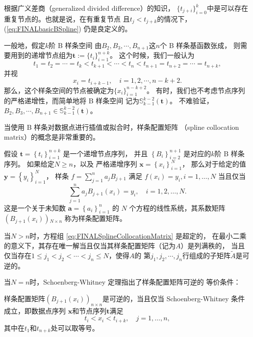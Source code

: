 根据广义差商（generalized divided difference）的知识，
$\{t_{j+i}\}_{i=0}^{k}$中是可以存在重复节点的。也就是说，在有重复节点
且$t_{j}<t_{j+k}$的情况下，(\ref{eq:FINALbasicBSpline}) 仍是良定义的。

一般地，假定$k$阶 B 样条空间
由$B_{2},B_{3},\cdots,B_{n+1}$这$n$个 B 样条基函数张成，
则需要用到的递增节点组为$\mathbf{t}:=\{t_{i}\}_{i=1}^{n+k}$。
这个时候，我们一般认为
\begin{displaymath}
  t_{1}=t_{2}=\cdots=t_{k}<t_{k+1}<\cdots<t_{n}<
  t_{n+1}=t_{n+2}=\cdots=t_{n+k},
\end{displaymath}
并视
\begin{displaymath}
  x_{i}=t_{i+k-1},\quad i=1,2,\cdots,n-k+2.
\end{displaymath}
那么，这个样条空间的节点被确定为$\{x_{i}\}_{i=1}^{n-k+2}$。
有时，我们也不考虑节点序列的严格递增性，而简单地将 B 样条空间
记为$\mathbb{S}_{k-1}^{k-2}(\mathbf{t})$。
不难验证，$B_{2},B_{3},\cdots,B_{n+1}\in \mathbb{S}_{k-1}^{k-2}(\mathbf{t})$。

当使用 B 样条对数据点进行插值或拟合时，样条配置矩阵
（spline collocation matrix）的概念是非常重要的。
\begin{defn}[样条配置矩阵]
  \label{def:FINALSplineCollocationMatrix}
  假设 \(\mathbf{t} = \left\{t_i\right\}_{i=1}^{n+k}\) 是一个递增节点序列，
  并且 \(\left\{B_i\right\}_{i=2}^{n+1}\) 是对应的$k$阶 \textnormal{B} 样条序列。
  如果给定$N\ge n$，以及
  严格递增序列 \(\mathbf{x} = \left\{x_i\right\}_{i=1}^N\)，
  那么对于给定的值 \(\mathbf{y} = \left\{y_i\right\}_{i=1}^N\)，
  样条 \(f = \sum_{j=1}^n a_j B_{j+1}\) 满足
  \(f(x_i) = y_i, i = 1,\dots,N\) 当且仅当
  \begin{equation}
    \label{eq:FINALSplineCollocationMatrix}
    \sum_{j=1}^n a_j B_{j+1}(x_i) = y_i, \quad i = 1,2,\dots,N.
  \end{equation}
  这是一个关于未知数 \(\mathbf{a} = \left\{a_i\right\}_{i=1}^n\) 的
  \(N\) 个方程的线性系统，其系数矩阵 \((B_{j+1}(x_i))\)$_{N\times n}$ 称为样条配置矩阵。
\end{defn}

当$N>n$时，方程组 \eqref{eq:FINALSplineCollocationMatrix} 是超定的，
在最小二乘的意义下，其存在唯一解当且仅当其样条配置矩阵（记为$A$）是列满秩的，
当且仅当存在$1\le j_{1}<j_{2}<\cdots<j_{n}\le N$，使得$A$的
第$j_{1},j_{2},\cdots,j_{n}$行组成的子矩阵$\tilde{A}$是可逆的。

当$N=n$时，Schoenberg-Whitney 定理指出了样条配置矩阵可逆的
等价条件\cite{GuideToSplines}： 

\begin{thm}
  \label{thm:FINALSchoenberg-Whitney}
  样条配置矩阵$(B_{j+1}(x_i))_{n\times n}$是可逆的，当且仅当
  Schoenberg-Whitney 条件成立，即数据点序列
  $\mathbf{x}$和节点序列$\mathbf{t}$满足
  \begin{equation}
    \label{eq:FINALSchoenberg-Whitney}
    t_i < x_i < t_{i+k}, \quad j = 1,\dots,n,
  \end{equation}
  其中在$t_{1}$和$t_{n+k}$处可以取等号。
\end{thm}

